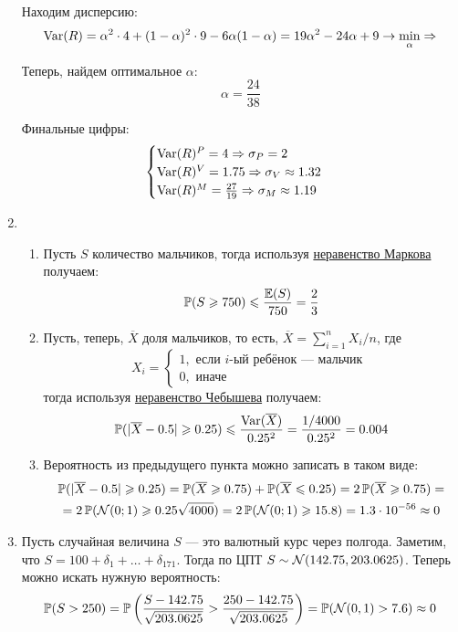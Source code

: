 \begin{enumerate}
Находим дисперсию:
\[
\operatorname{Var}(R) = \alpha^2 \cdot 4 + (1-\alpha)^2 \cdot 9 - 6\alpha (1-\alpha) = 19\alpha^2 -24\alpha + 9 \to \min_{\alpha} \Rightarrow
\]

Теперь, найдем оптимальное $\alpha$:
\[
\alpha = \frac{24}{38}
\]

Финальные цифры:
\[
\begin{cases}
\operatorname{Var}(R)^{P} = 4 \Rightarrow \sigma_{P} = 2 \\
\operatorname{Var}(R)^{V} = 1.75 \Rightarrow \sigma_{V} \approx 1.32 \\
\operatorname{Var}(R)^{M} = \frac{27}{19} \Rightarrow \sigma_{M} \approx 1.19 \\
\end{cases}
\]
\item
\begin{enumerate}
\item Пусть $S$ количество мальчиков, тогда используя \href{https://en.wikipedia.org/wiki/Markov%27s_inequality}{неравенство Маркова} получаем:
\[
\operatorname{\mathbb{P}}(S \geqslant 750) \leqslant \frac{\operatorname{\mathbb{E}}(S)}{750} = \frac{2}{3}
\]
\item Пусть, теперь, $\overline{X}$ доля мальчиков, то есть, $\overline{X} = \sum_{i=1}^n X_i /n$, где
\[
X_i =
\begin{cases}
1, \text{ если }i\text{-ый ребёнок — мальчик }\\
0, \text{ иначе }
\end{cases}
\]
тогда используя \href{https://en.wikipedia.org/wiki/Markov%27s_inequality}{неравенство Чебышева} получаем:
\[
\operatorname{\mathbb{P}}(|\overline{X} - 0.5| \geqslant 0.25) \leqslant \frac{\operatorname{Var}(\overline{X})}{0.25^2} = \frac{1/4000}{0.25^2} = 0.004
\]
\item Вероятность из предыдущего пункта можно записать в таком виде:
\begin{multline*}
\operatorname{\mathbb{P}}(|\overline{X} - 0.5| \geqslant 0.25) = \operatorname{\mathbb{P}}(\overline{X} \geqslant 0.75) + \operatorname{\mathbb{P}}(\overline{X} \leqslant 0.25) = 2\operatorname{\mathbb{P}}(\overline{X} \geqslant 0.75)=\\
= 2\operatorname{\mathbb{P}}(\mathcal{N}(0;1)\geqslant 0.25\sqrt{4000})=2\operatorname{\mathbb{P}}(\mathcal{N}(0;1)\geqslant 15.8) = 1.3 \cdot 10^{-56} \approx 0
\end{multline*}
\end{enumerate}
\item Пусть случайная величина $S$ —  это валютный курс через полгода. Заметим, что $S = 100 + \delta_1 + \ldots + \delta_{171}$.
Тогда по ЦПТ $S \sim \mathcal{N}(142.75, 203.0625)$. Теперь можно искать нужную вероятность:
\[
\operatorname{\mathbb{P}}(S > 250) = \operatorname{\mathbb{P}} \left(\frac{S -  142.75}{\sqrt{203.0625}} > \frac{250-142.75}{\sqrt{203.0625}} \right) = \operatorname{\mathbb{P}}(\mathcal{N}(0, 1) > 7.6) \approx 0
\]
\end{enumerate}
